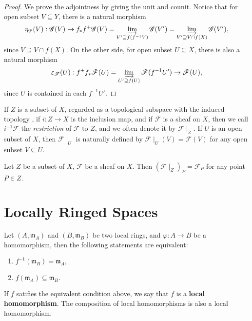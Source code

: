 \documentclass[11pt]{article}
\begin{document}
\begin{proof}
  We prove the adjointness by giving the unit and counit. 
  Notice that for open subset $ V \subseteq Y $, there is a natural morphism 
  $$\eta_{\mathscr{G}}(V): \mathscr{G}(V) \to f_{*}f^{+}\mathscr{G}(V)=\varinjlim_{V' \supseteq f(f^{-1}V)} \mathscr{G}(V')
  = \varinjlim_{V' \supseteq V \cap f(X)} \mathscr{G}(V'), $$
  since $ V \supseteq V \cap f(X)$. On the other side, for open subset $ U \subseteq X $, there is also a natural morphism 
  $$ \varepsilon_{\mathscr{F}}(U): f^{+}f_{*}\mathscr{F}(U)=
  \varinjlim_{U' \supseteq f(U)}\mathscr{F}(f^{-1}U') \to \mathscr{F}(U), $$
  since $ U $ is contained in each $ f^{-1}U' $.  
\end{proof}




\begin{definition}
  If $Z$ is a subset of $X$, regarded as a topological subspace with the induced topology
  , if $i: Z \to  X$ is the inclusion map, and if $\mathscr{F}$ is a sheaf on $X$, 
  then we call $i^{-1}\mathscr{F}$ the \emph{restriction} of $\mathscr{F}$ to $Z$, 
  and we often denote it by $\mathscr{F}\mid_{Z}$. 
  If $ U $ is an open subset of $ X $, then $ \mathscr{F}\mid_{U} $ is 
  naturally defined by $ \mathscr{F}\mid_{U}(V) = \mathscr{F}(V) $ for any open subset 
  $ V \subseteq U $. 
\end{definition}

\begin{corollary}
    \label{cor: stalks of restriction}
  Let $ Z $ be a subset of $ X $, $ \mathscr{F} $ be a sheaf on $ X $. 
  Then $ (\mathscr{F}\mid_{Z})_{P} = \mathscr{F}_{P} $ for any point $ P \in Z $. 
\end{corollary}

\begin{example}[Skyscraper]
  \cite[Exercise II.1.17]{hartsAG}
  
\end{example}


\section{Locally Ringed Spaces}

\begin{lemma}
  \label{lemma: local homomorphism}
  Let $ (A, \mathfrak{m}_{A}) $ and $ (B,\mathfrak{m}_{B}) $ be two local rings, 
  and $ \varphi : A \to B $ be a homomorphism, then the following statements are equivalent: 
  \begin{enumerate}[label = (\alph*)]
    \item $ f^{-1}(\mathfrak{m}_{B}) = \mathfrak{m}_{A} $, 
    \item $ f(\mathfrak{m}_{A}) \subseteq \mathfrak{m}_{B} $.  
  \end{enumerate} 
  If $ f $ satifies the equivalent condition above, we say that $ f $ is a \textbf{local homomorphism}. 
  The composition of local homomorphisms is also a local homomorphism. 
\end{lemma}
\end{document}

